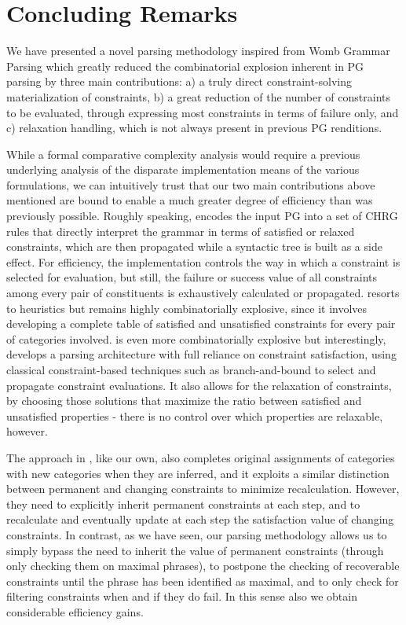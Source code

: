 \documentclass{llncs}
\begin{document}
\section{Concluding Remarks}

We have presented a novel parsing methodology inspired from Womb Grammar Parsing which greatly reduced the combinatorial explosion inherent in PG parsing by three main contributions: a) a truly direct constraint-solving materialization of constraints,  b) a great reduction of the number of constraints to be evaluated, through expressing most constraints in terms of failure only, and c) relaxation handling, which is not always present  in previous  PG renditions.

While a formal comparative complexity analysis would require a previous underlying  analysis of the disparate implementation means of the various formulations, we can intuitively trust that our two main contributions above mentioned are bound to enable a much greater degree of efficiency than  was previously possible. Roughly speaking, \cite{DB04} encodes the input PG into a set of CHRG rules that directly interpret the grammar in terms of satisfied or relaxed constraints, which are then propagated while a syntactic tree is built as a side effect. For efficiency, the implementation controls  the way in which a constraint is selected for evaluation, but still, the failure or success value of all constraints among every pair of constituents is exhaustively calculated or propagated.  \cite{BM00} resorts to heuristics but remains highly combinatorially explosive, since it involves developing a complete table of satisfied and unsatisfied constraints for every pair of categories involved. \cite{logcom13DuchierEtAl} is even more combinatorially explosive but interestingly, develops a parsing architecture with  full reliance on constraint satisfaction, using classical constraint-based techniques such as branch-and-bound to select and propagate constraint evaluations. It also allows for the relaxation of constraints, by choosing those solutions that maximize the ratio between satisfied and unsatisfied properties - there is no control over which properties are relaxable, however. 

The approach in \cite{DB04}, like our own, also completes original assignments of categories with
new categories when they are inferred, and it exploits a similar distinction between permanent and changing constraints to minimize recalculation. However, they need to explicitly inherit permanent constraints at each step, and to recalculate and eventually update at each step the satisfaction value of changing constraints. In contrast, as we have seen, our parsing methodology allows us to  simply bypass the need to inherit the value of permanent constraints (through only checking them on maximal phrases), to postpone the checking of recoverable constraints until the phrase has been identified as maximal, and to only check for filtering constraints when and if they do fail. In this sense also we obtain considerable efficiency gains.
\end{document}
